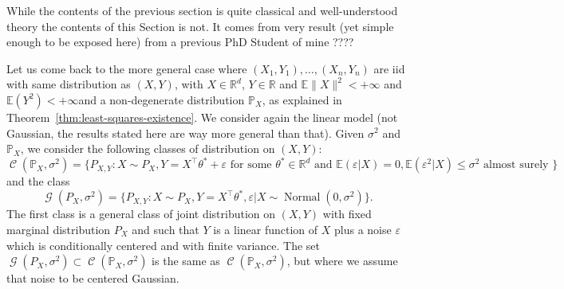 \documentclass[
	fontsize=11pt, %
	twoside=false, %
	numbers=noenddot, %
]{kaobook}
\DeclareMathOperator{\cC}{{\mathcal C}}
\DeclareMathOperator{\cG}{{\mathcal G}}
\DeclareMathOperator{\nor}{Normal}
\newcommand{\eps}{\varepsilon}
\renewcommand{\P}{\mathbb P}
\newcommand{\E}{\mathbb E}
\newcommand{\R}{\mathbb R}
\newcommand{\norm}[1]{\| #1 \|}
\begin{document}
While the contents of the previous section is quite classical and well-understood theory the contents of this Section is not.
It comes from very result (yet simple enough to be exposed here) from a previous PhD Student of mine ????

Let us come back to the more general case where $(X_1, Y_1), \ldots, (X_n, Y_n)$ are iid with same distribution as $(X, Y)$, with $X \in \R^d$, $Y \in \R$ and $\E \norm{X}^2 < +\infty$ and $\E(Y^2) < +\infty$and a non-degenerate distribution $\P_X$, as explained in Theorem~\ref{thm:least-squares-existence}.
We consider again the linear model (not Gaussian, the results stated here are way more general than that).
Given $\sigma^2$ and $\P_X$, we consider the following classes of distribution on $(X, Y)$:
\begin{equation*}
	\cC(\P_X, \sigma^2) = \{ P_{X, Y} : X \sim P_X, Y = X^\top \theta^* + \eps \text{ for some } \theta^* \in \R^d \text{ and } \E(\eps | X) = 0, \E(\eps^2 | X) \leq \sigma^2 \text{ almost surely }\}
\end{equation*}
and the class
\begin{equation*}
	\cG(P_X, \sigma^2) = \{ P_{X, Y} : X \sim P_X, Y = X^\top \theta^*, \eps | X \sim \nor(0, \sigma^2) \}.
\end{equation*}
The first class is a general class of joint distribution on $(X, Y)$ with fixed marginal distribution $P_X$ and such that $Y$ is a linear function of $X$ plus a noise $\eps$ which is conditionally centered and with finite variance. The set $\cG(P_X, \sigma^2) \subset \cC(\P_X, \sigma^2)$ is the same as $\cC(\P_X, \sigma^2)$, but where we assume that noise to be centered Gaussian.
\end{document}

